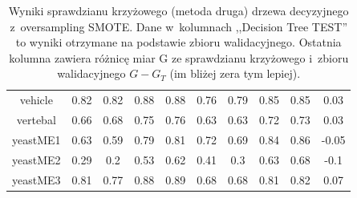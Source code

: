 \begin{table}[h]
\begin{center}
{\begin{tabular}{|c|c|c|c|c|c|c|c|c|c|}
			vehicle&0.82&0.82&0.88&0.88&0.76&0.79&0.85&0.85&0.03\\%
			vertebal&0.66&0.68&0.75&0.76&0.63&0.63&0.72&0.73&0.03\\%
			yeastME1&0.63&0.59&0.79&0.81&0.72&0.69&0.84&0.86&{-}0.05\\%
			yeastME2&0.29&0.2&0.53&0.62&0.41&0.3&0.63&0.68&{-}0.1\\%
			yeastME3&0.81&0.77&0.88&0.89&0.68&0.68&0.81&0.82&0.07\\%
			\hline%
		\end{tabular}}%
			\caption[Wyniki sprawdzianu krzyżowego z~metodą SMOTE, metoda druga]{Wyniki sprawdzianu krzyżowego (metoda druga) drzewa decyzyjnego z~oversampling SMOTE. Dane w~kolumnach ,,Decision Tree TEST'' to wyniki otrzymane na podstawie zbioru walidacyjnego. Ostatnia kolumna zawiera różnicę  miar G ze sprawdzianu krzyżowego i~zbioru walidacyjnego $G-G_T$ (im bliżej zera tym lepiej).}
			\label{CVoversampling2}
	\end{center}
\end{table}